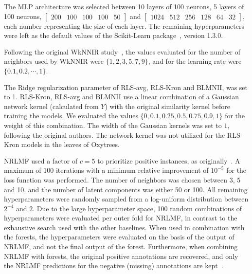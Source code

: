 \begin{appendices}
The MLP architecture was selected between 10 layers of 100 neurons, 5 layers of 100 neurons, $\begin{bmatrix} 200 & 100 & 100 & 100 & 50 \end{bmatrix}$ and $\begin{bmatrix} 1024 & 512 & 256 & 128 & 64 & 32 \end{bmatrix}$, each number representing the size of each layer. The remaining hyperparameters were left as the default values of the Scikit-Learn package~\cite{pedregosa_scikit-learn_2011}, version 1.3.0.

Following the original WkNNIR study~\cite{liu_drug-target_2022}, the values evaluated for the number of neighbors used by WkNNIR were $\{1,2,3,5,7,9\}$, and for the learning rate were $\{0.1,0.2,\cdots,1\}$.

The Ridge regularization parameter of RLS-avg, RLS-Kron and BLMNII, was set to 1.
%
RLS-Kron, RLS-avg and BLMNII use a linear combination of a Gaussian network kernel (calculated from $Y$) with the original similarity kernel before training the models. We evaluated the values $\{0, 0.1, 0.25, 0.5, 0.75, 0.9, 1\}$ for the weight of this combination. The width of the Gaussian kernels was set to $1$, following the original authors.
%
The network kernel was not utilized for the RLS-Kron models in the leaves of Oxytrees.


NRLMF used a factor of $c=5$ to prioritize positive instances, as originally~\cite{liu_neighborhood_2016}. A maximum of 100 iterations with a minimum relative improvement of $10^{-5}$ for the loss function was performed. The number of neighbors was chosen between 3, 5 and 10, and the number of latent components was either 50 or 100. All remaining hyperparameters were randomly sampled from a log-uniform distribution between $2^{-4}$ and $2$. Due to the large hyperparameter space, 100 random combinations of hyperparameters were evaluated per outer fold for NRLMF, in contrast to the exhaustive search used with the other baselines. When used in combination with the forests, the hyperparameters were evaluated on the basis of the output of NRLMF, and not the final output of the forest. Furthermore, when combining NRLMF with forests, the original positive annotations are recovered, and only the NRLMF predictions for the negative (missing) annotations are kept~\cite{pliakos_drug-target_2020}.


\end{appendices}
